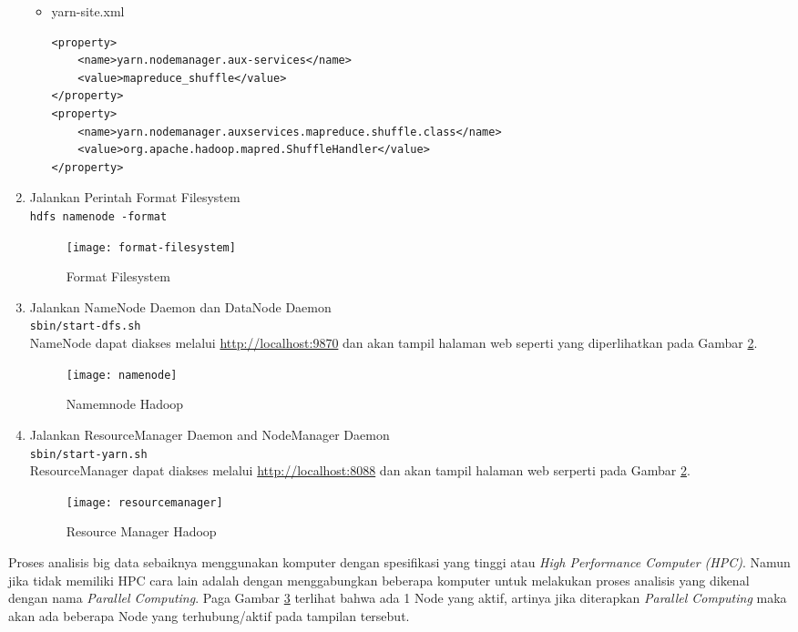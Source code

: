 \documentclass[a4paper]{tufte-handout}
\begin{document}
\begin{enumerate}
\begin{itemize}
\item yarn-site.xml
\begin{lstlisting}
<property>
	<name>yarn.nodemanager.aux-services</name>
	<value>mapreduce_shuffle</value>
</property>
<property>
	<name>yarn.nodemanager.auxservices.mapreduce.shuffle.class</name>
	<value>org.apache.hadoop.mapred.ShuffleHandler</value>
</property>
\end{lstlisting}


\end{itemize}

\item Jalankan Perintah Format Filesystem \\
{\tt hdfs namenode -format}

\begin{figure}[!ht]
\texttt{[image: format-filesystem]}
\caption{Format Filesystem}
\label{gam:format-filesystem}
\end{figure}

\item Jalankan NameNode Daemon dan DataNode Daemon \\
{\tt sbin/start-dfs.sh} \\
NameNode dapat diakses melalui \url{http://localhost:9870} dan akan tampil halaman web seperti yang diperlihatkan pada Gambar \ref{gam:namenode}.
\begin{figure}[!ht]
\texttt{[image: namenode]}
\caption{Namemnode Hadoop}
\label{gam:namenode}
\end{figure}

\item Jalankan ResourceManager Daemon and NodeManager Daemon \\
{\tt sbin/start-yarn.sh} \\
ResourceManager dapat diakses melalui \url{http://localhost:8088} dan akan tampil halaman web serperti pada Gambar \ref{gam:namenode}.
\begin{figure}[!ht]
\texttt{[image: resourcemanager]}
\caption{Resource Manager Hadoop}
\label{gam:resourcemanager}
\end{figure}
\end{enumerate}

Proses analisis big data sebaiknya menggunakan komputer dengan spesifikasi yang tinggi atau \textit{High Performance Computer (HPC)}. Namun jika tidak memiliki HPC cara lain adalah dengan menggabungkan beberapa komputer untuk melakukan proses analisis yang dikenal dengan nama \textit{Parallel Computing}. Paga Gambar \ref{gam:resourcemanager} terlihat bahwa ada 1 Node yang aktif, artinya jika diterapkan \textit{Parallel Computing} maka akan ada beberapa Node yang terhubung/aktif pada tampilan tersebut.
\end{document}
